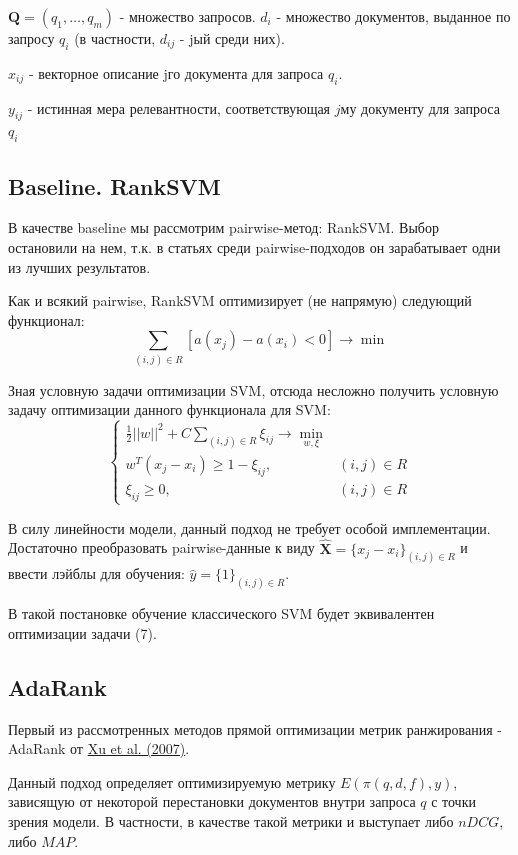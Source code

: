 \documentclass{article}[16pt]
\newcommand{\bibref}[3]{\hyperlink{#1}{#2 (#3)}}
\begin{document}
	$\mathbf{Q} = (q_1, \dots, q_m)$ - множество запросов. $d_i$ - множество документов, выданное по запросу $q_i$ (в частности, $d_{ij}$ - jый среди них). 
	
	$x_{ij}$ - векторное описание jго документа для запроса $q_i$. 
	
	$y_{ij}$ - истинная мера релевантности, соответствующая $j$му документу для запроса $q_i$
	\subsection{Baseline. RankSVM}
	В качестве baseline мы рассмотрим pairwise-метод: RankSVM. Выбор остановили на нем, т.к. в статьях среди pairwise-подходов он зарабатывает одни из лучших результатов.
	
	Как и всякий pairwise, RankSVM оптимизирует (не напрямую) следующий функционал:
	\begin{equation*}
		\sum_{(i, j) \in R} [a(x_j) - a(x_i) < 0] \rightarrow \min
	\end{equation*}
	
	Зная условную задачи оптимизации SVM, отсюда несложно получить условную задачу оптимизации данного функционала для SVM:
	\begin{equation}
		\begin{cases}
		\frac12 ||w||^2 + C \sum_{(i, j) \in R} \xi_{ij} \rightarrow \min_{w, \xi} \\
		w^T(x_j - x_i) \ge 1 - \xi_{ij}, & (i, j) \in R \\
		\xi_{ij} \ge 0, & (i, j) \in R
		\end{cases}
	\end{equation}
	
	В силу линейности модели, данный подход не требует особой имплементации. Достаточно преобразовать pairwise-данные к виду $\hat{\mathbf{X}} = \{x_j - x_i\}_{(i, j) \in R}$ и ввести лэйблы для обучения: $\hat{y} = \{1\}_{(i, j) \in R}$.
	
	В такой постановке обучение классического SVM будет эквивалентен оптимизации задачи (7).
	
	\subsection{AdaRank}
	Первый из рассмотренных методов прямой оптимизации метрик ранжирования - AdaRank от \bibref{adaRank}{Xu et al.}{2007}. 
	
	Данный подход определяет оптимизируемую метрику $E(\pi(q, d, f), y)$, зависящую от некоторой перестановки документов внутри запроса $q$ с точки зрения модели. В частности, в качестве такой метрики и выступает либо $nDCG$, либо $MAP$.
	
\end{document}
